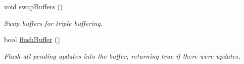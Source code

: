 \begin{Indent}
\begin{DoxyCompactItemize}
\mbox{\label{classrev_1_1_buffer_queue_a026fa64e3932c2eb841105eb7b74c76a}} 
void \mbox{\hyperlink{classrev_1_1_buffer_queue_a026fa64e3932c2eb841105eb7b74c76a}{swap\+Buffers}} ()
\begin{DoxyCompactList}\small\item\em Swap buffers for triple buffering. \end{DoxyCompactList}\item 
\mbox{\label{classrev_1_1_buffer_queue_a6ce10d9b7ffd61c40e9ec76fb19b1d19}} 
bool \mbox{\hyperlink{classrev_1_1_buffer_queue_a6ce10d9b7ffd61c40e9ec76fb19b1d19}{flush\+Buffer}} ()
\begin{DoxyCompactList}\small\item\em Flush all pending updates into the buffer, returning true if there were updates. \end{DoxyCompactList}\end{DoxyCompactItemize}
\end{Indent}
